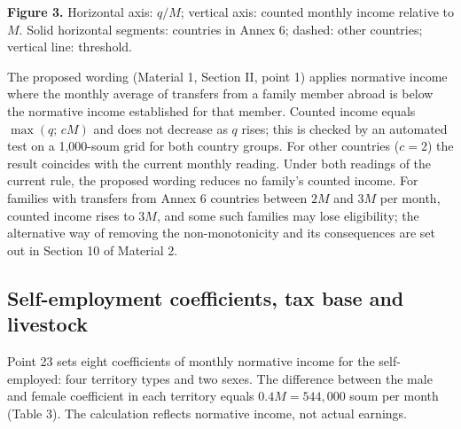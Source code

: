 \documentclass[12pt,a4paper]{extarticle}
\begin{document}
\begin{center}
\end{center}
\textbf{Figure 3.} Horizontal axis: $q/M$; vertical axis: counted monthly income relative to $M$. Solid horizontal segments: countries in Annex 6; dashed: other countries; vertical line: threshold.

The proposed wording (Material 1, Section II, point 1) applies normative income where the monthly average of transfers from a family member abroad is below the normative income established for that member. Counted income equals $\max(q;\,cM)$ and does not decrease as $q$ rises; this is checked by an automated test on a 1,000-soum grid for both country groups. For other countries ($c=2$) the result coincides with the current monthly reading. Under both readings of the current rule, the proposed wording reduces no family’s counted income. For families with transfers from Annex 6 countries between $2M$ and $3M$ per month, counted income rises to $3M$, and some such families may lose eligibility; the alternative way of removing the non-monotonicity and its consequences are set out in Section 10 of Material 2.

\subsection{Self-employment coefficients, tax base and livestock}
Point 23 sets eight coefficients of monthly normative income for the self-employed: four territory types and two sexes. The difference between the male and female coefficient in each territory equals $0.4M=544{,}000$ soum per month (Table 3). The calculation reflects normative income, not actual earnings.
\end{document}
